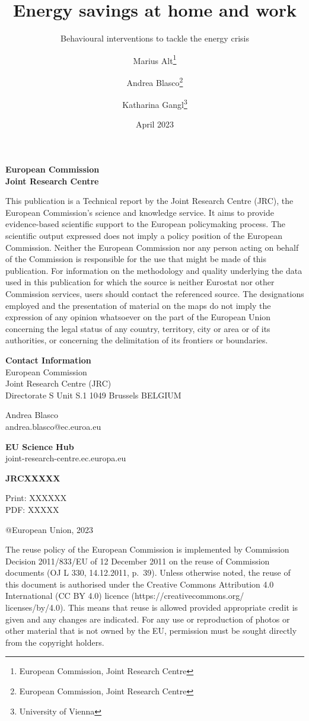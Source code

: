 \documentclass[
  11pt,
  captions=heading]{scrreport}
\title{Energy savings at home and work}
\subtitle{Behavioural interventions to tackle the energy crisis}
\author{Marius
Alt\thanks{European Commission, Joint Research Centre} \and Andrea
Blasco\thanks{European Commission, Joint Research Centre} \and Katharina
Gangl\thanks{University of Vienna}}
\date{April 2023}
\begin{document}
\maketitle

\newcommand{\smallnotice}{\footnotesize} 
\newcommand{\smallnoticebd}{\footnotesize\textbf}

{
\setcounter{tocdepth}{2}
\tableofcontents
}
\clearpage

\textbf{European Commission}\\
\textbf{Joint Research Centre}

\smallnotice This publication is a Technical report by the Joint
Research Centre (JRC), the European Commission's science and knowledge
service. It aims to provide evidence-based scientific support to the
European policymaking process. The scientific output expressed does not
imply a policy position of the European Commission. Neither the European
Commission nor any person acting on behalf of the Commission is
responsible for the use that might be made of this publication. For
information on the methodology and quality underlying the data used in
this publication for which the source is neither Eurostat nor other
Commission services, users should contact the referenced source. The
designations employed and the presentation of material on the maps do
not imply the expression of any opinion whatsoever on the part of the
European Union concerning the legal status of any country, territory,
city or area or of its authorities, or concerning the delimitation of
its frontiers or boundaries.

\textbf{Contact Information}\\
European Commission\\
Joint Research Centre (JRC)\\
Directorate S Unit S.1 1049 Brussels BELGIUM

Andrea Blasco\\
andrea.blasco@ec.euroa.eu

\textbf{EU Science Hub}\\
joint-research-centre.ec.europa.eu

\textbf{JRCXXXXX}

Print: XXXXXX\\
PDF: XXXXX

@European Union, 2023

\smallnotice The reuse policy of the European Commission is implemented
by Commission Decision 2011/833/EU of 12 December 2011 on the reuse of
Commission documents (OJ L 330, 14.12.2011, p.~39). Unless otherwise
noted, the reuse of this document is authorised under the Creative
Commons Attribution 4.0 International (CC BY 4.0) licence
(https://creativecommons.org/ licenses/by/4.0). This means that reuse is
allowed provided appropriate credit is given and any changes are
indicated. For any use or reproduction of photos or other material that
is not owned by the EU, permission must be sought directly from the
copyright holders.
\end{document}
